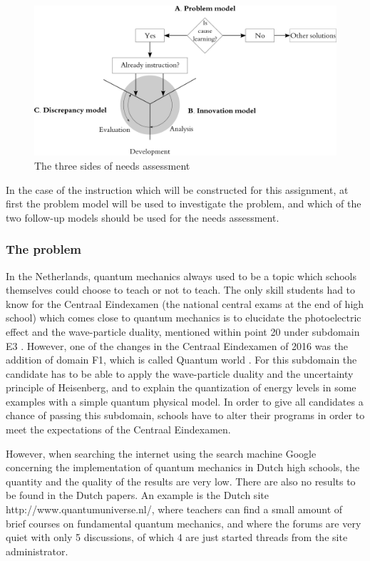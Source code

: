\documentclass[11pt,twoside]{report} %
\begin{document}
\begin{figure}[h]
\centering
\includegraphics[width=\textwidth]{needsassessment}
\caption{\footnotesize The three sides of needs assessment \protect\cite{smithragan}\label{fig:needsassessment}}
\end{figure}

In the case of the instruction which will be constructed for this assignment, at first the problem model will be used to investigate the problem, and which of the two follow-up models should be used for the needs assessment.

\subsubsection{The problem}

In the Netherlands, quantum mechanics always used to be a topic which schools themselves could choose to teach or not to teach. The only skill students had to know for the Centraal Eindexamen (the national central exams at the end of high school) which comes close to quantum mechanics is to elucidate the photoelectric effect and the wave-particle duality, mentioned within point 20 under subdomain E3 \cite{eindexamen2015}. However, one of the changes in the Centraal Eindexamen of 2016 was the addition of domain F1, which is called Quantum world \cite{eindexamen2016}. For this subdomain the candidate has to be able to apply the wave-particle duality and the uncertainty principle of Heisenberg, and to explain the quantization of energy levels in some examples with a simple quantum physical model. In order to give all candidates a chance of passing this subdomain, schools have to alter their programs in order to meet the expectations of the Centraal Eindexamen.

However, when searching the internet using the search machine Google concerning the implementation of quantum mechanics in Dutch high schools, the quantity and the quality of the results are very low. There are also no results to be found in the Dutch papers. An example is the Dutch site http://www.quantumuniverse.nl/, where teachers can find a small amount of brief courses on fundamental quantum mechanics, and where the forums are very quiet with only 5 discussions, of which 4 are just started threads from the site administrator.
\end{document}
